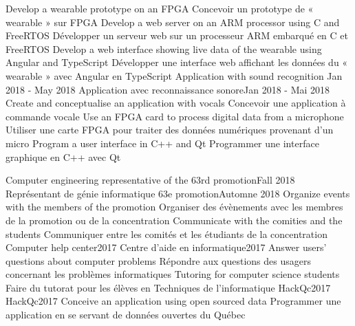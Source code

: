             \resumeItemListStart
                \resumeItemEnFr
                    {Develop a wearable prototype on an FPGA}
                    {Concevoir un prototype de « wearable » sur FPGA}
                \resumeItemEnFr
                    {Develop a web server on an ARM processor using C and FreeRTOS}
                    {Développer un serveur web sur un processeur ARM embarqué en C et FreeRTOS}
                \resumeItemEnFr
                    {Develop a web interface showing live data of the wearable using Angular and TypeScript}
                    {Développer une interface web affichant les données du « wearable » avec Angular en TypeScript}
            \resumeItemListEnd
      \resumeProjectHeadingEnFr
          {Application with sound recognition }{Jan 2018 - May 2018}
          {Application avec reconnaissance sonore}{Jan 2018 - Mai 2018}
            \resumeItemListStart
                \resumeItemEnFr
                    {Create and conceptualise an application with vocals}
                    {Concevoir une application à commande vocale}
                \resumeItemEnFr
                    {Use an FPGA card to process digital data from a microphone}
                    {Utiliser une carte FPGA pour traiter des données numériques provenant d’un micro}
                \resumeItemEnFr
                    {Program a user interface in C++ and Qt}
                    {Programmer une interface graphique en C++ avec Qt}
            \resumeItemListEnd
    \resumeSubHeadingListEnd


    \resumeSubHeadingListStart
      \resumeProjectHeadingEnFr
          {Computer engineering representative of the 63rd promotion}{Fall 2018}
          {Représentant de génie informatique 63e promotion}{Automne 2018}
            \resumeItemListStart
                \resumeItemEnFr
                    {Organize events with the members of the promotion}
                    {Organiser des évènements avec les membres de la promotion ou de la concentration}
                \resumeItemEnFr
                    {Communicate with the comities and the students}
                    {Communiquer entre les comités et les étudiants de la concentration}
            \resumeItemListEnd
      \resumeProjectHeadingEnFr
          {Computer help center}{2017}
          {Centre d’aide en informatique}{2017}
            \resumeItemListStart
                \resumeItemEnFr
                    {Answer users' questions about computer problems}
                    {Répondre aux questions des usagers concernant les problèmes informatiques}
                \resumeItemEnFr
                    {Tutoring for computer science students}
                    {Faire du tutorat pour les élèves en Techniques de l'informatique}
            \resumeItemListEnd
      \resumeProjectHeadingEnFr
          {HackQc}{2017}
          {HackQc}{2017}
            \resumeItemListStart
                \resumeItemEnFr
                    {Conceive an application using open sourced data}
                    {Programmer une application en se servant de données ouvertes du Québec}
            \resumeItemListEnd
    \resumeSubHeadingListEnd
  

